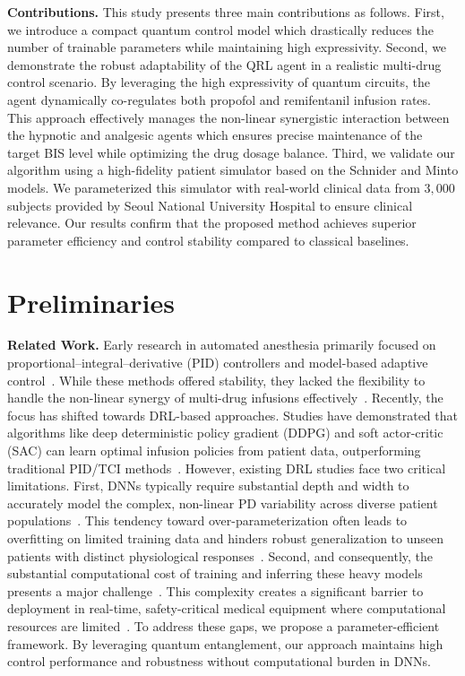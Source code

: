 \documentclass[pdflatex,sn-mathphys-num]{sn-jnl}%
\newcommand{\BfPara}[1]{{\noindent\bf#1.}\xspace}
\theoremstyle{thmstyleone}%
\theoremstyle{thmstyletwo}%
\theoremstyle{thmstylethree}%
\begin{document}
\BfPara{Contributions} This study presents three main contributions as follows.
%
First, we introduce a compact quantum control model which drastically reduces the number of trainable parameters while maintaining high expressivity.
%
Second, we demonstrate the robust adaptability of the QRL agent in a realistic multi-drug control scenario. By leveraging the high expressivity of quantum circuits, the agent dynamically co-regulates both propofol and remifentanil infusion rates. This approach effectively manages the non-linear synergistic interaction between the hypnotic and analgesic agents which ensures precise maintenance of the target BIS level while optimizing the drug dosage balance.
%
Third, we validate our algorithm using a high-fidelity patient simulator based on the Schnider and Minto models. We parameterized this simulator with real-world clinical data from $3,000$ subjects provided by Seoul National University Hospital to ensure clinical relevance. Our results confirm that the proposed method achieves superior parameter efficiency and control stability compared to classical baselines.

\section{Preliminaries} \label{sec:preliminaries}

\BfPara{Related Work}
Early research in automated anesthesia primarily focused on proportional–integral–derivative (PID) controllers and model-based adaptive control~\citep{mor_00_clo, pad_15_clo}. 
%
While these methods offered stability, they lacked the flexibility to handle the non-linear synergy of multi-drug infusions effectively~\citep{gen_01_mul}. 
%
Recently, the focus has shifted towards DRL-based approaches. 
%
Studies have demonstrated that algorithms like deep deterministic policy gradient (DDPG) and soft actor-critic (SAC) can learn optimal infusion policies from patient data, outperforming traditional PID/TCI methods~\citep{egh_21_pat, sch_22_con}. 
However, existing DRL studies face two critical limitations. 
%
First, DNNs typically require substantial depth and width to accurately model the complex, non-linear PD variability across diverse patient populations~\citep{raj_22_aii}. 
%
This tendency toward over-parameterization often leads to overfitting on limited training data and hinders robust generalization to unseen patients with distinct physiological responses~\citep{got_19_gui}. 
%
Second, and consequently, the substantial computational cost of training and inferring these heavy models presents a major challenge~\citep{moo_23_fou}. 
%
This complexity creates a significant barrier to deployment in real-time, safety-critical medical equipment where computational resources are limited~\citep{che_19_dee, gha_21_the}. 
%
To address these gaps, we propose a parameter-efficient framework. 
%
By leveraging quantum entanglement, our approach maintains high control performance and robustness without computational burden in DNNs.
\end{document}
